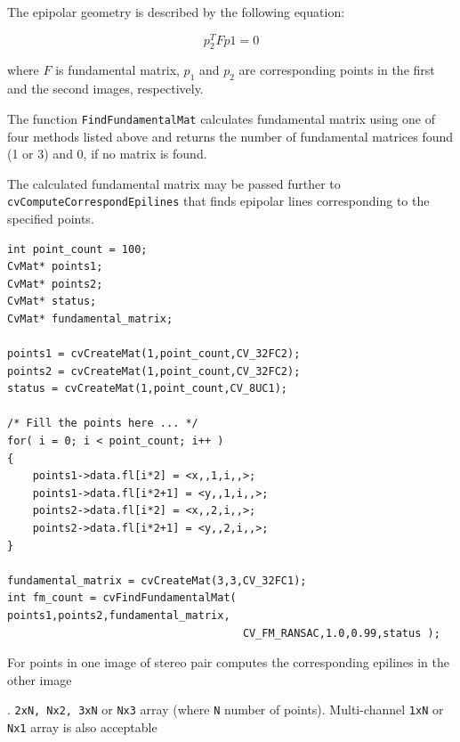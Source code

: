The epipolar geometry is described by the following equation:

\[ p_2^T F p1=0 \]

where $F$ is fundamental matrix, $p_1$ and $p_2$ are corresponding points in the first and the second images, respectively.

The function \texttt{FindFundamentalMat} calculates fundamental
matrix using one of four methods listed above and returns the number
of fundamental matrices found (1 or 3) and 0, if no matrix is found.

The calculated fundamental matrix may be passed further to
\texttt{cvComputeCorrespondEpilines} that finds epipolar lines
corresponding to the specified points.

\begin{lstlisting}
int point_count = 100;
CvMat* points1;
CvMat* points2;
CvMat* status;
CvMat* fundamental_matrix;

points1 = cvCreateMat(1,point_count,CV_32FC2);
points2 = cvCreateMat(1,point_count,CV_32FC2);
status = cvCreateMat(1,point_count,CV_8UC1);

/* Fill the points here ... */
for( i = 0; i < point_count; i++ )
{
    points1->data.fl[i*2] = <x,,1,i,,>;
    points1->data.fl[i*2+1] = <y,,1,i,,>;
    points2->data.fl[i*2] = <x,,2,i,,>;
    points2->data.fl[i*2+1] = <y,,2,i,,>;
}

fundamental_matrix = cvCreateMat(3,3,CV_32FC1);
int fm_count = cvFindFundamentalMat( points1,points2,fundamental_matrix,
                                     CV_FM_RANSAC,1.0,0.99,status );
\end{lstlisting}

\label{ComputeCorrespondEpilines}

For points in one image of stereo pair computes the corresponding epilines in the other image


\begin{description}
. \texttt{2xN, Nx2, 3xN} or \texttt{Nx3} array (where \texttt{N} number of points). Multi-channel \texttt{1xN} or \texttt{Nx1} array is also acceptable
\end{description}

